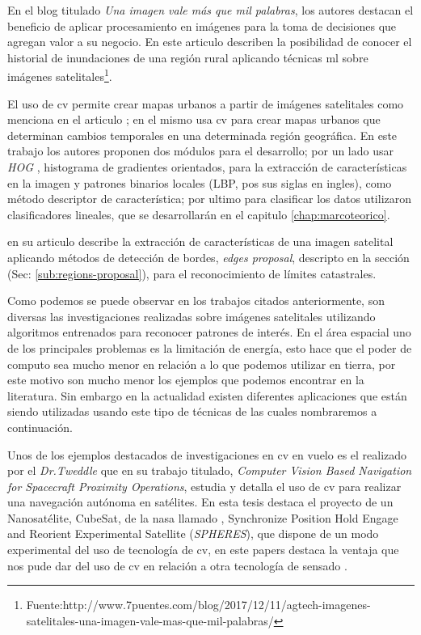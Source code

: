 En el blog titulado \textit{Una imagen vale más que mil palabras}, los autores destacan el beneficio de aplicar procesamiento en imágenes para la toma de decisiones que agregan valor a su negocio. En este articulo describen la posibilidad de conocer el historial de inundaciones de una región rural aplicando técnicas \ac{ml} sobre imágenes satelitales\footnote{Fuente:http://www.7puentes.com/blog/2017/12/11/agtech-imagenes-satelitales-una-imagen-vale-mas-que-mil-palabras/}.

El uso de \ac{cv} permite crear mapas urbanos a partir de imágenes satelitales como menciona en el articulo \citep{detectionHOG}; en el mismo usa \ac{cv} para crear mapas urbanos que determinan cambios temporales en una determinada región geográfica. En este trabajo los autores proponen dos módulos para el desarrollo; por un lado usar \textit{HOG} , histograma de gradientes orientados,\citep{HOG_algoritmo} para la extracción de características en la imagen y patrones binarios locales (LBP, pos sus siglas en ingles)\citep{LBP}, como método descriptor de característica; por ultimo para clasificar los datos utilizaron clasificadores lineales, que se desarrollarán en el capitulo \ref{chap:marcoteorico}. 

\cite{usman} en su articulo describe la extracción de características de una imagen satelital aplicando métodos de  detección de bordes, \textit{edges proposal}\citep{proposal}, descripto en la sección (Sec: \ref{sub:regions-proposal}), para el reconocimiento de límites catastrales.

Como podemos se puede observar en los trabajos citados anteriormente, son diversas las investigaciones realizadas sobre imágenes satelitales utilizando algoritmos entrenados para reconocer patrones de interés. En el área espacial uno de los principales problemas es la limitación de energía, esto hace que el poder de computo sea mucho menor en relación a lo que podemos utilizar en tierra, por este motivo son mucho menor los ejemplos que podemos encontrar en la literatura. Sin embargo en la actualidad existen diferentes aplicaciones que están siendo utilizadas usando este tipo de técnicas de las cuales nombraremos a continuación.

Unos de los ejemplos destacados de investigaciones en \ac{cv} en vuelo es el realizado por el \textit{Dr.Tweddle} que en su trabajo titulado, \textit{Computer Vision Based Navigation for Spacecraft Proximity Operations}, estudia y detalla el uso de \ac{cv} para realizar una navegación autónoma en satélites. En esta tesis destaca el proyecto de un Nanosatélite, CubeSat, de la \ac{nasa} llamado , Synchronize Position Hold Engage and Reorient Experimental Satellite (\textit{SPHERES}), que dispone de un modo experimental del uso de tecnología de \ac{cv}, en este papers destaca la ventaja que nos pude dar del uso de \ac{cv} en relación a otra tecnología de sensado \citep{Brent}.

